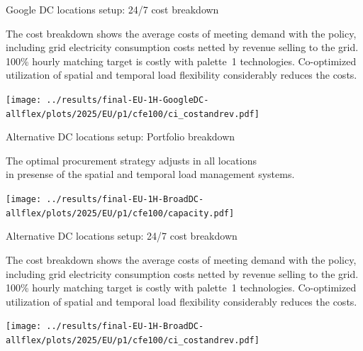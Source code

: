\begin{frame}{Google DC locations setup: 24/7 cost breakdown}

  \centering
  {\footnotesize
  The \alert{cost breakdown} shows the average costs of meeting demand with the policy, including grid electricity consumption costs netted by revenue selling to the grid.
  100\% hourly matching target is costly with palette~1 technologies. Co-optimized utilization of spatial and temporal load flexibility \alert{considerably reduces} the costs.
  }

\vspace{-0.2cm} 
\texttt{[image: ../results/final-EU-1H-GoogleDC-allflex/plots/2025/EU/p1/cfe100/ci\_costandrev.pdf]}

\end{frame}


\begin{frame}{Alternative DC locations setup: Portfolio breakdown}

  \centering
  {\footnotesize
  The optimal procurement strategy adjusts in all locations \\ 
  in presense of the \alert{spatial} and \alert{temporal} load management systems. 
  }

\texttt{[image: ../results/final-EU-1H-BroadDC-allflex/plots/2025/EU/p1/cfe100/capacity.pdf]}

\end{frame}


\begin{frame}{Alternative DC locations setup: 24/7 cost breakdown}

  \centering
  {\footnotesize
  The \alert{cost breakdown} shows the average costs of meeting demand with the policy, including grid electricity consumption costs netted by revenue selling to the grid.
  100\% hourly matching target is costly with palette~1 technologies. Co-optimized utilization of spatial and temporal load flexibility \alert{considerably reduces} the costs.
  }

\vspace{-0.2cm}   
\texttt{[image: ../results/final-EU-1H-BroadDC-allflex/plots/2025/EU/p1/cfe100/ci\_costandrev.pdf]}

\end{frame}


